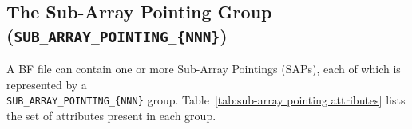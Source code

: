 \documentclass[a4paper,10pt,bibtotoc]{scrartcl}
\begin{document}
\clearpage
\subsection{The Sub-Array Pointing Group ({\tt SUB\_ARRAY\_POINTING\_\{NNN\}})}
\label{sec:sub-array pointing group}

A BF file can contain one or more Sub-Array Pointings (SAPs), each of which is represented by a\\ \verb|SUB_ARRAY_POINTING_{NNN}| group. Table~\ref{tab:sub-array pointing attributes} lists the set of attributes present in each group.

\begin{small}
\begin{table}[h]


\end{table}
\end{small}
\end{document}
